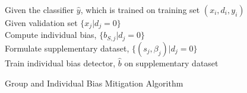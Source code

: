 \begin{algorithm}[H]
\SetAlgoLined
Given the classifier $\hat{y}$, which is trained on training set ${(x_i, d_i, y_i)}$ \\
Given validation set $\{x_j | d_j = 0\}$\\
Compute individual bias, $\{b_{S,j}|d_j=0\}$\\
Formulate supplementary dataset, $\{(s_j,\beta_j)|d_j = 0 \}$\\
Train individual bias detector, $\hat{b}$ on supplementary dataset\\
\caption{Group and Individual Bias Mitigation Algorithm \cite{lohia2018bias}}
    \end{algorithm}
